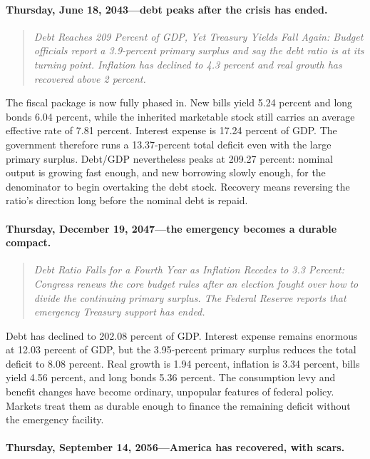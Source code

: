 \documentclass[11pt]{article}
\begin{document}
\paragraph{Thursday, June 18, 2043---debt peaks after the crisis has ended.}

\begin{quote}
\small\itshape
Debt Reaches 209 Percent of GDP, Yet Treasury Yields Fall Again: Budget officials report a
3.9-percent primary surplus and say the debt ratio is at its turning point.  Inflation has
declined to 4.3 percent and real growth has recovered above 2 percent.
\end{quote}

The fiscal package is now fully phased in.  New bills yield 5.24 percent and long bonds 6.04
percent, while the inherited marketable stock still carries an average effective rate of
7.81 percent.  Interest expense is 17.24 percent of GDP.  The government therefore runs a
13.37-percent total deficit even with the large primary surplus.  Debt/GDP nevertheless
peaks at 209.27 percent: nominal output is growing fast enough, and new borrowing slowly
enough, for the denominator to begin overtaking the debt stock.  Recovery means reversing
the ratio's direction long before the nominal debt is repaid.

\paragraph{Thursday, December 19, 2047---the emergency becomes a durable compact.}

\begin{quote}
\small\itshape
Debt Ratio Falls for a Fourth Year as Inflation Recedes to 3.3 Percent: Congress renews the
core budget rules after an election fought over how to divide the continuing primary surplus.
The Federal Reserve reports that emergency Treasury support has ended.
\end{quote}

Debt has declined to 202.08 percent of GDP.  Interest expense remains enormous at 12.03
percent of GDP, but the 3.95-percent primary surplus reduces the total deficit to 8.08
percent.  Real growth is 1.94 percent, inflation is 3.34 percent, bills yield 4.56 percent,
and long bonds 5.36 percent.  The consumption levy and benefit changes have become ordinary,
unpopular features of federal policy.  Markets treat them as durable enough to finance the
remaining deficit without the emergency facility.

\paragraph{Thursday, September 14, 2056---America has recovered, with scars.}
\end{document}
